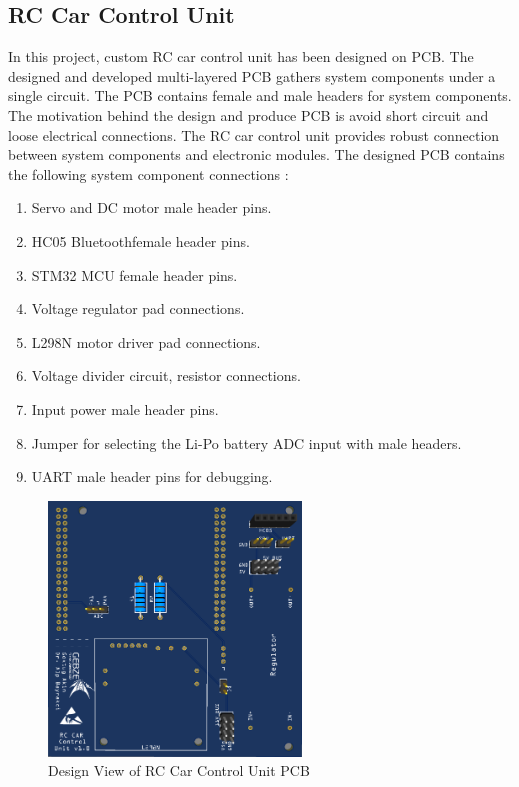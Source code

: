 
\subsection{RC Car Control Unit}
\label{sec_rc_control_unit}
In this project, custom RC car control unit has been designed on PCB. The designed and developed multi-layered PCB gathers system components under a single circuit. The PCB contains female and male headers for system components. The motivation behind the design and produce PCB is avoid short circuit and loose electrical connections. The RC car control unit provides robust connection between system components and electronic modules. The designed PCB contains the following system component connections :
\begin{enumerate}
    \item Servo and DC motor male header pins.
    \item HC05 Bluetooth\texttrademark\;female header pins.
    \item STM32 MCU female header pins.
    \item Voltage regulator pad connections.
    \item L298N motor driver pad connections.
    \item Voltage divider circuit, resistor connections.
    \item Input power male header pins.
    \item Jumper for selecting the Li-Po battery ADC input with male headers.
    \item UART male header pins for debugging.
\end{enumerate}


\begin{figure}[!htbp]
    \centering
    \includegraphics[width=0.6\textwidth]{Imgs/pcb.png}
    \caption{\label{fig:custom_pcb}Design View of RC Car Control Unit PCB}
\end{figure}

